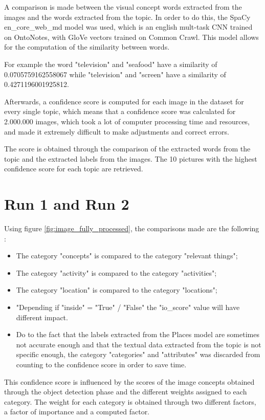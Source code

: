     A comparison is made between the visual concept words extracted from the images and the words extracted from the topic. In order to do this, the SpaCy en\_core\_web\_md model was used, which is an english mult-task CNN trained on OntoNotes, with GloVe vectors trained on Common Crawl. This model allows for the computation of the similarity between words.

    For example the word "television" and "seafood" have a similarity of 0.0705759162558067 while "television" and "screen" have a similarity of 0.4271196001925812.

    Afterwards, a confidence score is computed for each image in the dataset for every single topic, which means that a confidence score was calculated for 2.000.000 images, which took a lot of computer processing time and resources, and made it extremely difficult to make adjustments and correct errors.

    The score is obtained through the comparison of the extracted words from the
    topic and the extracted labels from the images. The 10 pictures with the highest confidence score for each topic are retrieved.

    \section{Run 1 and Run 2 }
    Using figure \ref{fig:image_fully_processed}, the comparisons made are the following :

    \begin{itemize}
        \item The category "concepts" is compared to the category "relevant things";
        \item The category "activity" is compared to the category "activities";
        \item The category "location" is compared to the category "locations";
        \item "Depending if "inside" = "True" / "False" the "io\_score" value will have different impact.
        \item Do to the fact that the labels extracted from the Places model are sometimes not accurate enough and that the textual data extracted from the topic is not specific enough, the category "categories" and "attributes" was discarded from counting to the confidence score in order to save time.
    \end{itemize}
    

 This confidence score is influenced by the
scores of the image concepts obtained through the object detection phase and
the different weights assigned to each category. The weight for each category is
obtained through two different factors, a factor of importance and a computed
factor.

